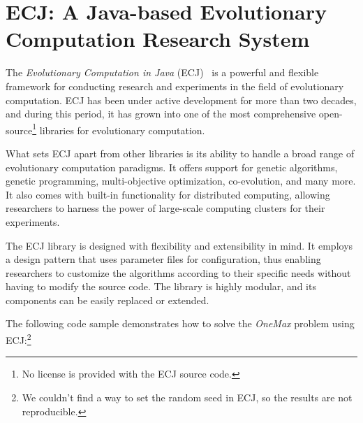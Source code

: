 \section{ECJ: A Java-based Evolutionary Computation Research System}
\label{sec:sota:ecj}

  The \emph{Evolutionary Computation in Java} (ECJ)~\autocite{ECJ} is a powerful and flexible framework for conducting research and experiments in 
  the field of evolutionary computation.
  ECJ has been under active development for more than two decades, and during 
  this period, it has grown into one of the most comprehensive 
  open-source\footnote{No license is provided with the ECJ source code.} 
  libraries for evolutionary computation.

  What sets ECJ apart from other libraries is its ability to handle a broad 
  range of evolutionary computation paradigms.
  It offers support for genetic algorithms, genetic programming, 
  multi-objective optimization, co-evolution, and many more.
  It also comes with built-in functionality for distributed computing, allowing 
  researchers to harness the power of large-scale computing clusters for their 
  experiments.

  The ECJ library is designed with flexibility and extensibility in mind.
  It employs a design pattern that uses parameter files for configuration, thus 
  enabling researchers to customize the algorithms according to their specific 
  needs without having to modify the source code.
  The library is highly modular, and its components can be easily replaced or 
  extended.

  The following code sample demonstrates how to solve the \textit{OneMax} 
  problem using ECJ:\footnote{We couldn't find a way to set the random seed in
  ECJ, so the results are not reproducible.}


